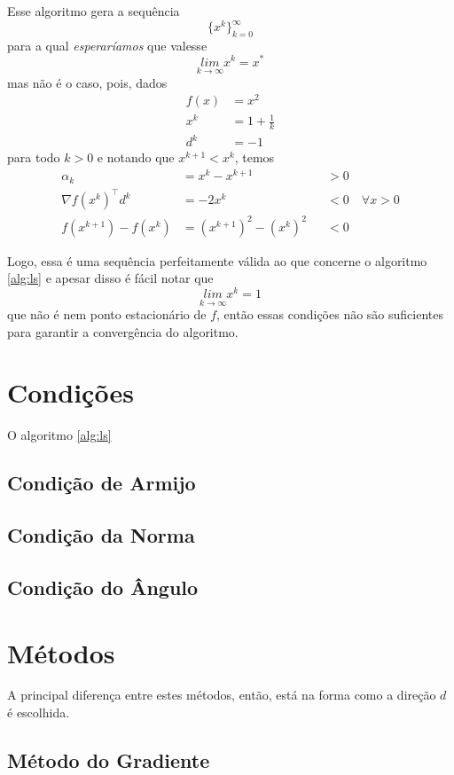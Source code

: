 \documentclass[a4paper,11pt]{article}
\begin{document}
        Esse algoritmo gera a sequência
            $$ \{x^k\}_{k = 0}^\infty $$
        para a qual \emph{esperaríamos} que valesse
            $$ \underset{k \rightarrow \infty}{lim} x^k = x^*$$
        mas não é o caso, pois, dados
            \begin{align*}
                f(x) &= {x}^2 \\
                x^k  &= 1 + \frac{1}{k} \\
                d^k  &= -1
            \end{align*}
        para todo $k > 0$ e notando que $x^{k+1} < x^{k}$, temos
        \begin{align*}
            \alpha_k &= x^k - x^{k+1}  & &> 0 \\
            \nabla f(x^k)^\top d^k &= -2x^k & &< 0 \quad \forall x > 0 \\
            f(x^{k+1}) - f(x^k) &= (x^{k+1})^2 - (x^{k})^2 & &< 0
        \end{align*}

        Logo, essa é uma sequência perfeitamente válida ao que concerne o algoritmo \ref{alg:ls} e apesar disso é fácil notar que
            $$ \underset{k \rightarrow \infty}{lim} x^k = 1$$
        que não é nem ponto estacionário de $f$, então essas condições não são suficientes para garantir a convergência do algoritmo.
    \section*{Condições}
        O algoritmo \ref{alg:ls}

        \subsection*{Condição de Armijo}
        \subsection*{Condição da Norma}
        \subsection*{Condição do Ângulo}
    \section*{Métodos}
        A principal diferença entre estes métodos, então, está na forma como a direção $d$ é escolhida.

        \subsection*{Método do Gradiente}
\end{document}
